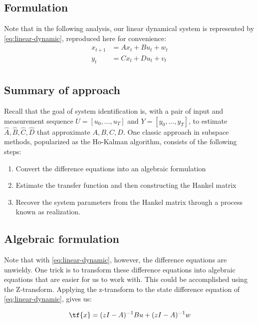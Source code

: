 \documentclass{article}[12pt]
\begin{document}
\subsection{Formulation}

Note that in the following analysis, our linear dynamical system is represented by \eqref{eq:linear-dynamic}, reproduced here for convenience:
\begin{equation*}
\begin{aligned}
    x_{t+1} &= Ax_t + Bu_t + w_t\\
    y_{t} &= Cx_t + Du_t + v_t\\
\end{aligned}
\label{eq:linear-difference-equations-noiseless-analysis}
\end{equation*}

\subsection{Summary of approach}
Recall that the goal of system identification is, with a pair of input and measurement sequence $U = [u_0, ..., u_T]$ and $Y = [y_0, ..., y_T]$, to estimate $\hat{A}, \hat{B}, \hat{C}, \hat{D}$ that approximate $A, B, C, D$. One classic approach in subspace methods, popularized as the Ho-Kalman algorithm, consists of the following steps:

\begin{enumerate}
    \item Convert the difference equations into an algebraic formulation
    \item Estimate the transfer function and then constructing the Hankel matrix
    \item Recover the system parameters from the Hankel matrix through a process known as realization.
\end{enumerate}


\subsection{Algebraic formulation}

Note that with \eqref{eq:linear-dynamic}, however, the difference equations are unwieldy. One trick is to transform these difference equations into algebraic equations that are easier for us to work with. This could be accomplished using the Z-transform. Applying the z-transform to the state difference equation of \eqref{eq:linear-dynamic}, gives us:

$$ \tf{x} = (zI - A)^{-1}Bu + (zI-A)^{-1}w$$
\end{document}
